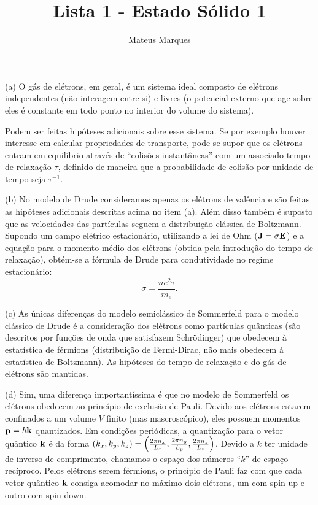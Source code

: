 \documentclass[a4paper,10pt]{article}
\title{\Huge{\textbf{Lista 1 - Estado Sólido 1}}}
\author{Mateus Marques}
\begin{document}
\maketitle

\section{}

(a) O gás de elétrons, em geral, é um sistema ideal composto de elétrons independentes (não interagem entre si) e livres (o potencial externo que age sobre eles é constante em todo ponto no interior do volume do sistema).

Podem ser feitas hipóteses adicionais sobre esse sistema. Se por exemplo houver interesse em calcular propriedades de transporte, pode-se supor que os elétrons entram em equilíbrio através de ``colisões instantâneas'' com um associado tempo de relaxação $\tau$, definido de maneira que a probabilidade de colisão por unidade de tempo seja $\tau^{-1}$.

\n

(b) No modelo de Drude consideramos apenas os elétrons de valência e são feitas as hipóteses adicionais descritas acima no item (a). Além disso também é suposto que as velocidades das partículas seguem a distribuição clássica de Boltzmann. Supondo um campo elétrico estacionário, utilizando a lei de Ohm ($\vb{J} = \sigma \vb{E}$) e a equação para o momento médio dos elétrons (obtida pela introdução do tempo de relaxação), obtém-se a fórmula de Drude para condutividade no regime estacionário:
$$
\sigma = \frac{ne^2\tau}{m_e}.
$$

\n

(c) As únicas diferenças do modelo semiclássico de Sommerfeld para o modelo clássico de Drude é a consideração dos elétrons como partículas quânticas (são descritos por funções de onda que satisfazem Schrödinger) que obedecem à estatística de férmions (distribuição de Fermi-Dirac, não mais obedecem à estatística de Boltzmann). As hipóteses do tempo de relaxação e do gás de elétrons são mantidas.

\n

(d) Sim, uma diferença importantíssima é que no modelo de Sommerfeld os elétrons obedecem ao princípio de exclusão de Pauli. Devido aos elétrons estarem confinados a um volume $V$ finito (mas mascroscópico), eles possuem momentos $\vb{p} = \hbar \vb{k}$ quantizados. Em condições periódicas, a quantização para o vetor quântico $\vb{k}$ é da forma $(k_x, k_y, k_z) = \qty(\frac{2\pi n_x}{L_x}, \frac{2\pi n_y}{L_y}, \frac{2\pi n_z}{L_z})$. Devido a $k$ ter unidade de inverso de comprimento, chamamos o espaço dos números ``$k$'' de espaço recíproco. Pelos elétrons serem férmions, o princípio de Pauli faz com que cada vetor quântico $\vb{k}$ consiga acomodar no máximo dois elétrons, um com spin up e outro com spin down.
\end{document}
